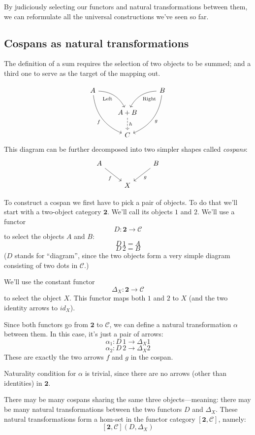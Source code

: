 \documentclass[DaoFP]{subfiles}
\begin{document}
By judiciously selecting our functors and natural transformations between them, we can reformulate all the universal constructions we've seen so far.

\subsection{Cospans as natural transformations}

The definition of a sum requires the selection of two objects to be summed; and a third one to serve as the target of the mapping out.

\[
 \begin{tikzcd}
 A
 \arrow[dr,  bend left, "\text{Left}"']
 \arrow[ddr, bend right, "f"']
 && B
 \arrow[dl, bend right, "\text{Right}"]
 \arrow[ddl, bend left, "g"]
 \\
&A + B
\arrow[d, dashed, "h"]
\\
& C
 \end{tikzcd}
\]
This diagram can be further decomposed into two simpler shapes called \emph{cospans}:
\[
 \begin{tikzcd}
 A
 \arrow[dr, "f"']
 && B
 \arrow[dl, "g"]
 \\
 & X
 \end{tikzcd}
\]

To construct a cospan we first have to pick a pair of objects. To do that we'll start with a two-object category $\mathbf{2}$. We'll call its objects $1$ and $2$. 
We'll use a functor 
\[ D \colon \mathbf{2} \to \mathcal{C}\]
to select the objects $A$ and $B$: 
\[D\, 1 = A\]
\[ D\, 2 = B \]
($D$ stands for ``diagram'', since the two objects form a very simple diagram consisting of two dots in $\mathcal{C}$.)

We'll use the constant functor 
\[ \Delta_X \colon \mathbf{2} \to \mathcal{C} \]
to select the object $X$. This functor maps both $1$ and $2$ to $X$ (and the two identity arrows to $id_X$).

Since both functors go from $\mathbf{2}$ to $\mathcal{C}$, we can define a natural transformation $\alpha$ between them. In this case, it's just a pair of arrows:
\[ \alpha_1 \colon D \, 1 \to \Delta_X 1 \]
\[ \alpha_2 \colon D \, 2 \to \Delta_X 2 \]
These are exactly the two arrows $f$ and $g$ in the cospan. 

Naturality condition for $\alpha$ is trivial, since there are no arrows (other than identities) in $\mathbf{2}$.

There may be many cospans sharing the same three objects---meaning: there may be many natural transformations between the two functors $D$ and  $\Delta_X$. These natural transformations form a hom-set in the functor category $[\mathbf{2}, \mathcal{C}]$, namely:
\[ [\mathbf{2}, \mathcal{C}](D, \Delta_X) \]
\end{document}
